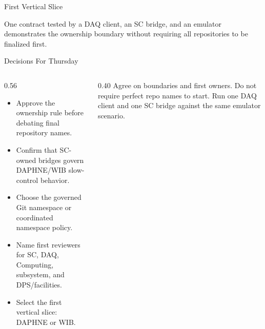 \documentclass[aspectratio=169,10pt]{beamer}
\begin{document}
\begin{frame}{First Vertical Slice}
\centering
{}

\medskip
{}
  {One contract tested by a DAQ client, an SC bridge, and an emulator demonstrates the ownership boundary without requiring all repositories to be finalized first.}
  {}
\end{frame}

\begin{frame}{Decisions For Thursday}
\begin{columns}[T,onlytextwidth]
  \begin{column}{0.56\textwidth}
    \begin{itemize}
      \DuneTightList
      \item Approve the ownership rule before debating final repository names.
      \item Confirm that SC-owned bridges govern DAPHNE/WIB slow-control behavior.
      \item Choose the governed Git namespace or coordinated namespace policy.
      \item Name first reviewers for SC, DAQ, Computing, subsystem, and DPS/facilities.
      \item Select the first vertical slice: DAPHNE or WIB.
    \end{itemize}
  \end{column}
  \begin{column}{0.40\textwidth}
      {Agree on boundaries and first owners. Do not require perfect repo names to start.}
      {}
    \smallskip
      {Run one DAQ client and one SC bridge against the same emulator scenario.}
      {}
  \end{column}
\end{columns}
\end{frame}
\end{document}
